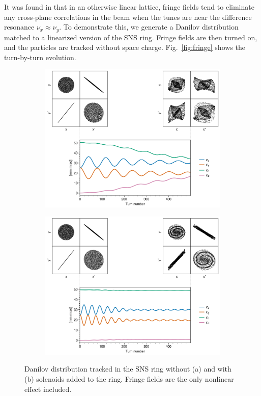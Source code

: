 It was found in \cite{Holmes2018} that in an otherwise linear lattice, fringe fields tend to eliminate any cross-plane correlations in the beam when the tunes are near the difference resonance $\nu_x \approx \nu_y$. To demonstrate this, we generate a Danilov distribution matched to a linearized version of the SNS ring. Fringe fields are then turned on, and the particles are tracked without space charge. Fig.~\ref{fig:fringe} shows the turn-by-turn evolution.
%
\begin{figure}
    \centering
    \begin{subfigure}{0.7\textwidth}
        \includegraphics[width=\textwidth]{Images/chapter3/fringe.png}
        \caption{}
        \label{fig:fringe_a}
    \end{subfigure}
    \vfill
    \vspace*{1.5cm}
    \vfill
    \begin{subfigure}{0.7\textwidth}
        \includegraphics[width=\textwidth]{Images/chapter3/fringe_solenoid.png}
        \caption{}
    \end{subfigure}
    \caption{Danilov distribution tracked in the SNS ring without (a) and with (b) solenoids added to the ring. Fringe fields are the only nonlinear effect included.}
    \label{fig:fringe_b}
\end{figure}
